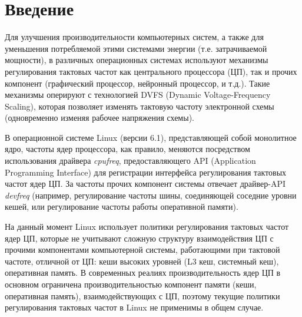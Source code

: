 \section{Введение}
\label{sec:Section0} 

    Для улучшения производительности компьютерных систем, а также для уменьшения потребляемой
    этими системами энергии (т.е. затрачиваемой мощности), в различных операционных системах
    используют механизмы регулирования тактовых частот как центрального процессора (ЦП),
    так и прочих компонент (графический процессор, нейронный процессор, и т.д.). Такие механизмы
    оперируют с технологией DVFS (Dynamic Voltage-Frequency Scaling), которая позволяет изменять
    тактовую частоту электронной схемы (одновременно изменяя рабочее напряжения схемы).

    В операционной системе Linux (версии 6.1), представляющей собой монолитное ядро,
    частоты ядер процессора, как правило, меняются посредством использования драйвера
    \textit{cpufreq}, предоставляющего API (Application Programming Interface) для регистрации
    интерфейса регулирования тактовых частот ядер ЦП. За частоты прочих компонент системы отвечает
    драйвер-API \textit{devfreq} (например, регулирование частоты шины, соединяющей соседние
    уровни кешей, или регулирование частоты работы оперативной памяти).

    На данный момент Linux использует политики регулирования тактовых частот ядер ЦП, которые
    не учитывают сложную структуру взаимодействия ЦП с прочими компонентами компьютерной системы,
    работающими при тактовой частоте, отличной от ЦП: кеши высоких уровней (L3 кеш, системный кеш),
    оперативная память. В современных реалиях производительность ядер ЦП в основном ограничена
    производительностью компонент памяти (кеши, оперативная память), взаимодействующих с ЦП,
    поэтому текущие политики регулирования тактовых частот в Linux не применимы в общем случае.

